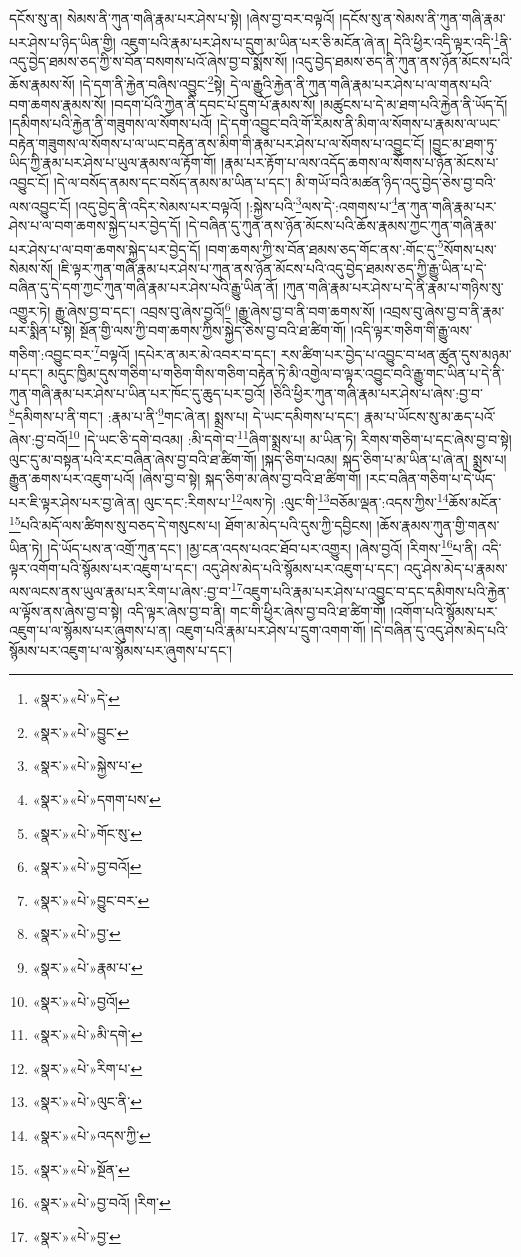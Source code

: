 དངོས་སུ་ན། སེམས་ནི་ཀུན་གཞི་རྣམ་པར་ཤེས་པ་སྟེ། །ཞེས་བྱ་བར་བལྟའོ། །དངོས་སུ་ན་སེམས་ནི་ཀུན་གཞི་རྣམ་པར་ཤེས་པ་ཉིད་ཡིན་གྱི། འཇུག་པའི་རྣམ་པར་ཤེས་པ་དྲུག་མ་ཡིན་པར་ཅི་མངོན་ཞེ་ན། དེའི་ཕྱིར་འདི་ལྟར་འདི་\footnote{«སྣར་»«པེ་»དེ་}ནི་འདུ་བྱེད་ཐམས་ཅད་ཀྱི་ས་བོན་བསགས་པའོ་ཞེས་བྱ་བ་སྨོས་སོ། །འདུ་བྱེད་ཐམས་ཅད་ནི་ཀུན་ནས་ཉོན་མོངས་པའི་ཆོས་རྣམས་སོ། །དེ་དག་ནི་རྐྱེན་བཞིས་འབྱུང་\footnote{«སྣར་»«པེ་»བྱུང་}སྟེ། དེ་ལ་རྒྱུའི་རྐྱེན་ནི་ཀུན་གཞི་རྣམ་པར་ཤེས་པ་ལ་གནས་པའི་བག་ཆགས་རྣམས་སོ། །བདག་པོའི་ཀྱེན་ནི་དབང་པོ་དྲུག་པོ་རྣམས་སོ། །མཚུངས་པ་དེ་མ་ཐག་པའི་རྐྱེན་ནི་ཡོད་དོ། །དམིགས་པའི་རྐྱེན་ནི་གཟུགས་ལ་སོགས་པའོ། །དེ་དག་འབྱུང་བའི་གོ་རིམས་ནི་མིག་ལ་སོགས་པ་རྣམས་ལ་ཡང་བརྟེན་གཟུགས་ལ་སོགས་པ་ལ་ཡང་བརྟེན་ནས་མིག་གི་རྣམ་པར་ཤེས་པ་ལ་སོགས་པ་འབྱུང་ངོ། །བྱུང་མ་ཐག་ཏུ་ཡིད་ཀྱི་རྣམ་པར་ཤེས་པ་ཡུལ་རྣམས་ལ་རྟོག་གོ། །རྣམ་པར་རྟོག་པ་ལས་འདོད་ཆགས་ལ་སོགས་པ་ཉོན་མོངས་པ་འབྱུང་ངོ། །དེ་ལ་བསོད་ནམས་དང་བསོད་ནམས་མ་ཡིན་པ་དང་། མི་གཡོ་བའི་མཚན་ཉིད་འདུ་བྱེད་ཅེས་བྱ་བའི་ལས་འབྱུང་ངོ། །འདུ་བྱེད་ནི་འདིར་སེམས་པར་བལྟའོ། །:སྐྱེས་པའི་\footnote{«སྣར་»«པེ་»སྐྱེས་པ་}ལས་དེ་:འགགས་པ་\footnote{«སྣར་»«པེ་»དགག་པས་}ན་ཀུན་གཞི་རྣམ་པར་ཤེས་པ་ལ་བག་ཆགས་སྐྱེད་པར་བྱེད་དོ། །དེ་བཞིན་དུ་ཀུན་ནས་ཉོན་མོངས་པའི་ཆོས་རྣམས་ཀྱང་ཀུན་གཞི་རྣམ་པར་ཤེས་པ་ལ་བག་ཆགས་སྐྱེད་པར་བྱེད་དོ། །བག་ཆགས་ཀྱི་ས་བོན་ཐམས་ཅད་གོང་ནས་:གོང་དུ་\footnote{«སྣར་»«པེ་»གོང་སུ་}སོགས་པས་སེམས་སོ། །ཇི་ལྟར་ཀུན་གཞི་རྣམ་པར་ཤེས་པ་ཀུན་ནས་ཉོན་མོངས་པའི་འདུ་བྱེད་ཐམས་ཅད་ཀྱི་རྒྱུ་ཡིན་པ་དེ་བཞིན་དུ་དེ་དག་ཀྱང་ཀུན་གཞི་རྣམ་པར་ཤེས་པའི་རྒྱུ་ཡིན་ནོ། །ཀུན་གཞི་རྣམ་པར་ཤེས་པ་དེ་ནི་རྣམ་པ་གཉིས་སུ་འགྱུར་ཏེ། རྒྱུ་ཞེས་བྱ་བ་དང་། འབྲས་བུ་ཞེས་བྱའོ།\footnote{«སྣར་»«པེ་»བྱ་བའོ།} །རྒྱུ་ཞེས་བྱ་བ་ནི་བག་ཆགས་སོ། །འབྲས་བུ་ཞེས་བྱ་བ་ནི་རྣམ་པར་སྨིན་པ་སྟེ། སྔོན་གྱི་ལས་ཀྱི་བག་ཆགས་ཀྱིས་སྐྱེད་ཅེས་བྱ་བའི་ཐ་ཚིག་གོ། །འདི་ལྟར་གཅིག་གི་རྒྱུ་ལས་གཅིག་:འབྱུང་བར་\footnote{«སྣར་»«པེ་»བྱུང་བར་}བལྟའོ། །དཔེར་ན་མར་མེ་འབར་བ་དང་། རས་ཚིག་པར་བྱེད་པ་འབྱུང་བ་ཕན་ཚུན་དུས་མཉམ་པ་དང་། མདུང་ཁྱིམ་དུས་གཅིག་པ་གཅིག་གིས་གཅིག་བརྟེན་ཏེ་མི་འགྱེལ་བ་ལྟར་འབྱུང་བའི་རྒྱུ་གང་ཡིན་པ་དེ་ནི་ཀུན་གཞི་རྣམ་པར་ཤེས་པ་ཡིན་པར་ཁོང་དུ་ཆུད་པར་བྱའོ། །ཅིའི་ཕྱིར་ཀུན་གཞི་རྣམ་པར་ཤེས་པ་ཞེས་:བྱ་བ་\footnote{«སྣར་»«པེ་»བྱ་}དམིགས་པ་ནི་གང་། :རྣམ་པ་ནི་\footnote{«སྣར་»«པེ་»རྣམ་པ་}གང་ཞེ་ན། སྨྲས་པ། དེ་ཡང་དམིགས་པ་དང་། རྣམ་པ་ཡོངས་སུ་མ་ཆད་པའོ་ཞེས་:བྱ་བའོ།\footnote{«སྣར་»«པེ་»བྱའོ།} །དེ་ཡང་ཅི་དགེ་བའམ། :མི་དགེ་བ་\footnote{«སྣར་»«པེ་»མི་དགེ་}ཞིག་སྨྲས་པ། མ་ཡིན་ཏེ། རིགས་གཅིག་པ་དང་ཞེས་བྱ་བ་སྟེ། ལུང་དུ་མ་བསྟན་པའི་རང་བཞིན་ཞེས་བྱ་བའི་ཐ་ཚིག་གོ། །སྐད་ཅིག་པའམ། སྐད་ཅིག་པ་མ་ཡིན་པ་ཞེ་ན། སྨྲས་པ། རྒྱུན་ཆགས་པར་འཇུག་པའོ། །ཞེས་བྱ་བ་སྟེ། སྐད་ཅིག་མ་ཞེས་བྱ་བའི་ཐ་ཚིག་གོ། །རང་བཞིན་གཅིག་པ་དེ་ཡོད་པར་ཇི་ལྟར་ཤེས་པར་བྱ་ཞེ་ན། ལུང་དང་:རིགས་པ་\footnote{«སྣར་»«པེ་»རིག་པ་}ལས་ཏེ། :ལུང་གི་\footnote{«སྣར་»«པེ་»ལུང་ནི་}བཅོམ་ལྡན་:འདས་ཀྱིས་\footnote{«སྣར་»«པེ་»འདས་ཀྱི་}ཆོས་མངོན་\footnote{«སྣར་»«པེ་»སྔོན་}པའི་མདོ་ལས་ཚིགས་སུ་བཅད་དེ་གསུངས་པ། ཐོག་མ་མེད་པའི་དུས་ཀྱི་དབྱིངས། །ཆོས་རྣམས་ཀུན་གྱི་གནས་ཡིན་ཏེ། །དེ་ཡོད་པས་ན་འགྲོ་ཀུན་དང་། །མྱ་ངན་འདས་པའང་ཐོབ་པར་འགྱུར། །ཞེས་བྱའོ། །རིགས་\footnote{«སྣར་»«པེ་»བྱ་བའོ། །རིག་}པ་ནི། འདི་ལྟར་འགོག་པའི་སྙོམས་པར་འཇུག་པ་དང་། འདུ་ཤེས་མེད་པའི་སྙོམས་པར་འཇུག་པ་དང་། འདུ་ཤེས་མེད་པ་རྣམས་ལས་ལངས་ནས་ཡུལ་རྣམ་པར་རིག་པ་ཞེས་:བྱ་བ་\footnote{«སྣར་»«པེ་»བྱ་}འཇུག་པའི་རྣམ་པར་ཤེས་པ་འབྱུང་བ་དང་དམིགས་པའི་རྐྱེན་ལ་ལྟོས་ནས་ཞེས་བྱ་བ་སྟེ། འདི་ལྟར་ཞེས་བྱ་བ་ནི། གང་གི་ཕྱིར་ཞེས་བྱ་བའི་ཐ་ཚིག་གོ། །འགོག་པའི་སྙོམས་པར་འཇུག་པ་ལ་སྙོམས་པར་ཞུགས་པ་ན། འཇུག་པའི་རྣམ་པར་ཤེས་པ་དྲུག་འགག་གོ། །དེ་བཞིན་དུ་འདུ་ཤེས་མེད་པའི་སྙོམས་པར་འཇུག་པ་ལ་སྙོམས་པར་ཞུགས་པ་དང་། 